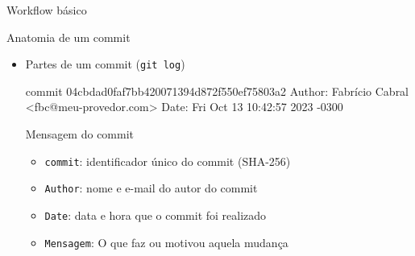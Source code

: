 \documentclass[14pt]{beamer}
\begin{document}
\begin{frame}[fragile]{Workflow básico}
\end{frame}

\begin{frame}[fragile]{Anatomia de um commit}
    \begin{itemize}
        \item Partes de um commit (\texttt{git log})
        \begin{bashcode}
            commit 04cbdad0faf7bb420071394d872f550ef75803a2
            Author: Fabrício Cabral <fbc@meu-provedor.com>
            Date:   Fri Oct 13 10:42:57 2023 -0300
            
                Mensagem do commit
        \end{bashcode}
        \begin{itemize}
            \item \texttt{commit}: identificador único do commit (SHA-256)
            \item \texttt{Author}: nome e e-mail do autor do commit
            \item \texttt{Date}: data e hora que o commit foi realizado
            \item \texttt{Mensagem}: O que faz ou motivou aquela mudança
        \end{itemize}
    \end{itemize}
\end{frame}
\end{document}
